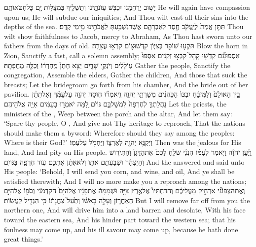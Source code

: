 {יָשׁ֣וּב יְרַחֲמֵ֔נוּ יִכְבֹּ֖שׁ עֲוֺנֹתֵ֑ינוּ וְתַשְׁלִ֛יךְ בִּמְצֻל֥וֹת יָ֖ם כׇּל\maqqaf חַטֹּאותָֽם׃}
{He will again have compassion upon us; He will subdue our iniquities; And Thou wilt cast all their sins into the depths of the sea.}
{תִּתֵּ֤ן אֱמֶת֙ לְיַֽעֲקֹ֔ב חֶ֖סֶד לְאַבְרָהָ֑ם אֲשֶׁר\maqqaf נִשְׁבַּ֥עְתָּ לַאֲבֹתֵ֖ינוּ מִ֥ימֵי קֶֽדֶם׃}
{Thou wilt show faithfulness to Jacob, mercy to Abraham, As Thou hast sworn unto our fathers from the days of old.}
\setcounter{chap}{2}
\setcounter{verse}{15}
{תִּקְע֥וּ שׁוֹפָ֖ר בְּצִיּ֑וֹן קַדְּשׁוּ\maqqaf צ֖וֹם קִרְא֥וּ עֲצָרָֽה׃}
{Blow the horn in Zion, Sanctify a fast, call a solemn assembly;}
{אִסְפוּ\maqqaf עָ֞ם קַדְּשׁ֤וּ קָהָל֙ קִבְצ֣וּ זְקֵנִ֔ים אִסְפוּ֙ עֽוֹלָלִ֔ים וְיֹנְקֵ֖י שָׁדָ֑יִם יֵצֵ֤א חָתָן֙ מֵֽחֶדְר֔וֹ וְכַלָּ֖ה מֵחֻפָּתָֽהּ׃}
{Gather the people, Sanctify the congregation, Assemble the elders, Gather the children, And those that suck the breasts; Let the bridegroom go forth from his chamber, And the bride out of her pavilion.}
{בֵּ֤ין הָאוּלָם֙ וְלַמִּזְבֵּ֔חַ יִבְכּוּ֙ הַכֹּ֣הֲנִ֔ים מְשָׁרְתֵ֖י יְהֹוָ֑ה וְֽיֹאמְר֞וּ ח֧וּסָה יְהֹוָ֣ה עַל\maqqaf עַמֶּ֗ךָ וְאַל\maqqaf תִּתֵּ֨ן נַחֲלָתְךָ֤ לְחֶרְפָּה֙ לִמְשׇׁל\maqqaf בָּ֣ם גּוֹיִ֔ם לָ֚מָּה יֹאמְר֣וּ בָעַמִּ֔ים אַיֵּ֖ה אֱלֹהֵיהֶֽם׃}
{Let the priests, the ministers of the \lord, Weep between the porch and the altar, And let them say: ‘Spare thy people, O \lord, And give not Thy heritage to reproach, That the nations should make them a byword: Wherefore should they say among the peoples: Where is their God?’}
{וַיְקַנֵּ֥א יְהֹוָ֖ה לְאַרְצ֑וֹ וַיַּחְמֹ֖ל עַל\maqqaf עַמּֽוֹ׃}
{Then was the \lord\space jealous for His land, And had pity on His people.}
{וַיַּ֨עַן יְהֹוָ֜ה וַיֹּ֣אמֶר לְעַמּ֗וֹ הִנְנִ֨י שֹׁלֵ֤חַ לָכֶם֙ אֶת\maqqaf הַדָּגָן֙ וְהַתִּיר֣וֹשׁ וְהַיִּצְהָ֔ר וּשְׂבַעְתֶּ֖ם אֹת֑וֹ וְלֹא\maqqaf אֶתֵּ֨ן אֶתְכֶ֥ם ע֛וֹד חֶרְפָּ֖ה בַּגּוֹיִֽם׃}
{And the \lord\space answered and said unto His people: ‘Behold, I will send you corn, and wine, and oil, And ye shall be satisfied therewith; And I will no more make you a reproach among the nations;}
{וְֽאֶת\maqqaf הַצְּפוֹנִ֞י אַרְחִ֣יק מֵעֲלֵיכֶ֗ם וְהִדַּחְתִּיו֮ אֶל\maqqaf אֶ֣רֶץ צִיָּ֣ה וּשְׁמָמָה֒ אֶת\maqqaf פָּנָ֗יו אֶל\maqqaf הַיָּם֙ הַקַּדְמֹנִ֔י וְסֹפ֖וֹ אֶל\maqqaf הַיָּ֣ם הָאַחֲר֑וֹן וְעָלָ֣ה בָאְשׁ֗וֹ וְתַ֙עַל֙ צַחֲנָת֔וֹ כִּ֥י הִגְדִּ֖יל לַעֲשֽׂוֹת׃}
{But I will remove far off from you the northern one, And will drive him into a land barren and desolate, With his face toward the eastern sea, And his hinder part toward the western sea; that his foulness may come up, and his ill savour may come up, because he hath done great things.’}
